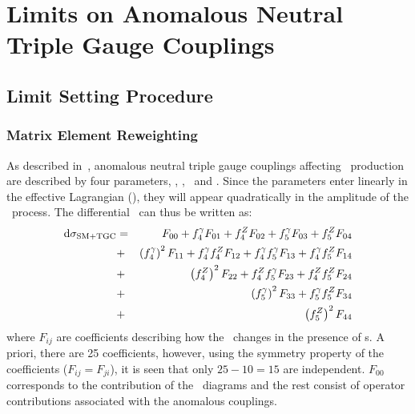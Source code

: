 \graphicspath{{Chapters/TGCLimits/Figures/}}
\chapter{Limits on Anomalous Neutral Triple Gauge Couplings}
\label{chap:TGCLimits}

\section{Limit Setting Procedure}

\subsection{Matrix Element Reweighting}
\label{sec:TGC-reweighting}

As described in~, anomalous neutral triple gauge couplings affecting \ZZ\
production are described by four parameters, \ffourg, \ffourZ, \ffiveg\ and
\ffiveZ.
Since the parameters enter linearly in the effective Lagrangian
(), they will appear
quadratically in the amplitude of the \ZZllll\ process. The differential \cx\
can thus be written as:
\begin{eqnarray}\label{eqn:dsigma}
{\rm d}\sigma_{\rm SM+TGC} & = & F_{00} + f_4^\gamma F_{01} + f_4^Z F_{02} + f_5^\gamma F_{03} + f_5^Z F_{04}  \nonumber \\
&+& \left(f_4^\gamma\right)^2F_{11} + f_4^\gamma f_4^Z F_{12} +  f_4^\gamma f_5^\gamma F_{13} + f_4^\gamma f_5^Z F_{14}  \nonumber \\
&+& \left(f_4^Z\right)^2F_{22} + f_4^Zf_5^\gamma F_{23} + f_4^Zf_5^Z F_{24}  \nonumber \\
&+& \left(f_5^\gamma\right)^2F_{33} + f_5^\gamma f_5^Z F_{34} \nonumber \\
&+& \left(f_5^Z\right)^2F_{44}
\end{eqnarray}
where $F_{ij}$ are coefficients describing how the \cx\ changes in the presence
of \TGC s. A priori, there are 25 coefficients, however, using the 
symmetry property of the coefficients ($F_{ij}=F_{ji}$), it is seen 
that only $25-10=15$ are independent. $F_{00}$ corresponds to the contribution
of the \sm\ diagrams and the rest consist of operator contributions associated with the
anomalous couplings. 


